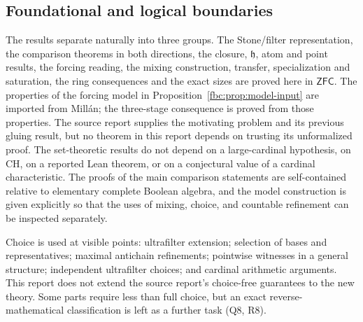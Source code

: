 \documentclass[11pt,letterpaper]{article}
\theoremstyle{definition}
\theoremstyle{remark}
\newcommand{\ch}{\mathfrak h}
\newcommand{\ZFC}{\mathsf{ZFC}}
\begin{document}
\subsection{Foundational and logical boundaries}
The results separate naturally into three groups. The Stone/filter
representation, the comparison theorems in both directions, the closure,
$\ch$, atom and point results, the forcing reading, the mixing
construction, transfer, specialization and saturation, the ring
consequences and the exact sizes are proved here in $\ZFC$. The
properties of the forcing model in Proposition~\ref{fbc:prop:model-input}
are imported from Mill\'an; the three-stage consequence is proved from
those properties. The source report supplies the motivating problem and
its previous gluing result, but no theorem in this report depends on
trusting its unformalized proof. The set-theoretic results do not depend
on a large-cardinal hypothesis, on CH, on a reported Lean theorem, or on
a conjectural value of a cardinal characteristic. The proofs of the main
comparison statements are self-contained relative to elementary complete
Boolean algebra, and the model construction is given explicitly so that
the uses of mixing, choice, and countable refinement can be inspected
separately.

Choice is used at visible points: ultrafilter extension; selection
of bases and representatives; maximal antichain refinements;
pointwise witnesses in a general structure; independent ultrafilter
choices; and cardinal arithmetic arguments. This report does not extend
the source report's choice-free guarantees to the new theory. Some parts
require less than full choice, but an exact reverse-mathematical
classification is left as a further task (Q8, R8).
\end{document}
